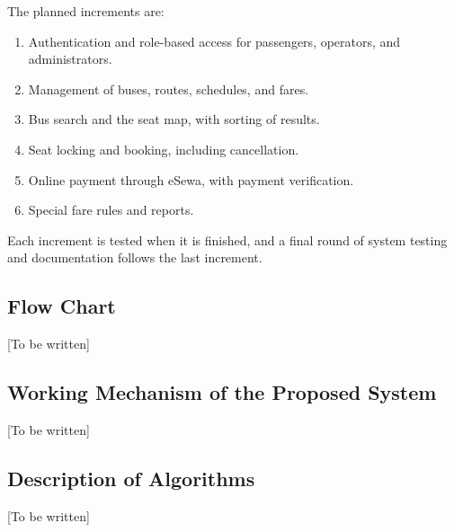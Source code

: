 The planned increments are:
\begin{enumerate}
	\item Authentication and role-based access for passengers, operators, and administrators.
	\item Management of buses, routes, schedules, and fares.
	\item Bus search and the seat map, with sorting of results.
	\item Seat locking and booking, including cancellation.
	\item Online payment through eSewa, with payment verification.
	\item Special fare rules and reports.
\end{enumerate}

Each increment is tested when it is finished, and a final round of system testing and documentation follows the last increment.

\subsection{Flow Chart}
[To be written]

\subsection{Working Mechanism of the Proposed System}
[To be written]

\subsection{Description of Algorithms}
[To be written]